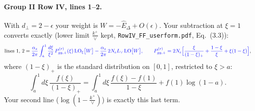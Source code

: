 \documentclass[10pt]{article}
\numberwithin{equation}{section}
\newcommand{\new}[1]{{\color{blue}#1}}
\newcommand{\Lv}{L_{\vee}}
\newcommand{\Eh}{\hat E}
\newcommand{\LOx}[1]{{\rm LO}_\xi\big[#1\big]}
\begin{document}
\paragraph{Group II Row IV, lines 1--2.} With $d_\perp=2-\epsilon$ your weight is $W=-\Eh_\Delta+O(\epsilon)$. Your subtraction at $\xi=1$ converts exactly (lower limit $\frac{k^+}{\vee}$ kept, \texttt{RowIV\_FF\_userform.pdf}, Eq.~(3.3)):
\begin{equation}
\text{lines 1, 2}=\new{\frac{\alpha_s}{2\pi}\int_{a}^1\frac{d\xi}{\xi^2}\,P^{(r)}_{gg,+}(\xi)\,\LOx{W}-\frac{\alpha_s}{2\pi}\,2N_c\Lv\,{\rm LO}\big[W\big],\qquad P^{(r)}_{gg,+}=2N_c\Big[\frac{\xi}{(1-\xi)_+}+\frac{1-\xi}{\xi}+\xi(1-\xi)\Big]},
\label{eq:IVstd}
\end{equation}
where $(1-\xi)_+$ is the standard distribution on $[0,1]$, restricted to $\xi>a$:
\begin{equation*}
\int_a^1d\xi\,\frac{f(\xi)}{(1-\xi)_+}=\int_a^1d\xi\,\frac{f(\xi)-f(1)}{1-\xi}+f(1)\log(1-a).
\end{equation*}
Your second line ($\log(1-\frac{k^+}{\vee})$) is exactly this last term.
\end{document}
